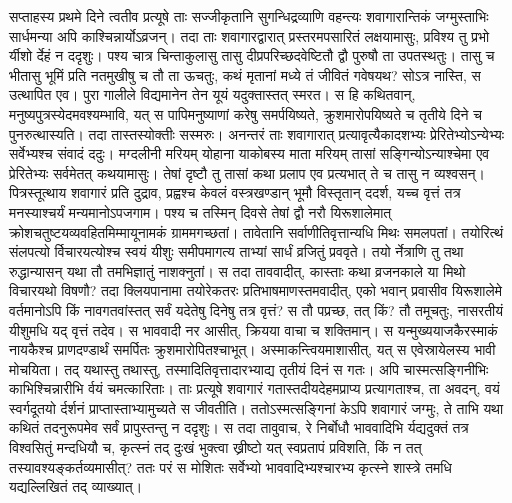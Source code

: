 \adhyAya
{}
\vakya सप्ताहस्य प्रथमे दिने त्वतीव प्रत्यूषे ताः सज्जीकृतानि सुगन्धिद्रव्याणि वहन्त्यः शवागारान्तिकं जग्मुस्ताभिः सार्धमन्या अपि काश्चिन्नार्योऽव्रजन्।
\vakya तदा ताः शवागारद्वारात् प्रस्तरमपसारितं लक्षयामासुः,
\vakya प्रविश्य तु प्रभो र्यीशो र्देहं न ददृशुः।
\vakya पश्य चात्र चिन्ताकुलासु तासु दीप्रपरिच्छदवेष्टितौ द्वौ पुरुषौ ता उपतस्थतुः।
\vakya तासु च भीतासु भूमिं प्रति नतमुखीषु च तौ ता ऊचतुः, कथं मृतानां मध्ये तं जीवितं गवेषयथ?
\vakya सोऽत्र नास्ति, स उत्थापित एव।
\vakya पुरा गालीले विद्यमानेन तेन यूयं यदुक्तास्तत् स्मरत।
\vakya स हि कथितवान्, मनुष्यपुत्रस्येदमवश्यम्भावि, यत् स पापिमनुष्याणां करेषु समर्पयिष्यते, क्रुशमारोपयिष्यते च तृतीये दिने च पुनरुत्थास्यति। तदा तास्तस्योक्तीः सस्मरुः।
\vakya अनन्तरं ताः शवागारात् प्रत्यावृत्यैकादशभ्यः प्रेरितेभ्योऽन्येभ्यः सर्वेभ्यश्च संवादं ददुः।
\vakya मग्दलीनी मरियम् योहाना याकोबस्य माता मरियम् तासां सङ्गिन्योऽन्याश्चेमा एव प्रेरितेभ्यः सर्वमेतत् कथयामासुः।
\vakya तेषां दृष्टौ तु तासां कथा प्रलाप एव प्रत्यभात् ते च तासु न व्यश्वसन्।
\vakya पित्रस्तूत्थाय शवागारं प्रति दुद्राव, प्रह्वश्च केवलं वस्त्रखण्डान् भूमौ विस्तृतान् ददर्श, यच्च वृत्तं तत्र मनस्याश्चर्यं मन्यमानोऽपजगाम।
\vakya पश्य च तस्मिन् दिवसे तेषां द्वौ नरौ यिरूशालेमात् क्रोशचतुष्टयव्यवहितमिम्मायूनामकं ग्राममगच्छतां।
\vakya तावेतानि सर्वाणीतिवृत्तान्यधि मिथः समलपतां।
\vakya तयोरित्थं संलपत्यो र्विचारयत्योश्च स्वयं यीशुः समीपमागत्य ताभ्यां सार्धं व्रजितुं प्रववृते।
\vakya तयो र्नेत्राणि तु तथा रुद्धान्यासन् यथा तौ तमभिज्ञातुं नाशक्नुतां।
\vakya स तदा ताववादीत्, कास्ताः कथा व्रजनकाले या मिथो विचारयथो विषणौ?
\vakya तदा क्लियपानामा तयोरेकतरः प्रतिभाषमाणस्तमवादीत्, एको भवान् प्रवासीव यिरूशालेमे वर्तमानोऽपि किं नावगतवांस्तत् सर्वं यदेतेषु दिनेषु तत्र वृत्तं?
\vakya स तौ पप्रच्छ, तत् किं? तौ तमूचतुः, नासरतीयं यीशुमधि यद् वृत्तं तदेव। स भाववादी नर आसीत्, क्रियया वाचा च शक्तिमान्।
\vakya स यन्मुख्ययाजकैरस्माकं नायकैश्च प्राणदण्डार्थं समर्पितः क्रुशमारोपितश्चाभूत्।
\vakya अस्माकन्त्वियमाशासीत्, यत् स एवेस्रायेलस्य भावी मोचयिता। तद् यथास्तु तथास्तु, तस्मादितिवृत्तादारभ्याद्य तृतीयं दिनं स गतः।
\vakya अपि चास्मत्सङ्गिनीभिः काभिश्चिन्नारीभि र्वयं चमत्कारिताः।
\vakya ताः प्रत्यूषे शवागारं गतास्तदीयदेहमप्राप्य प्रत्यागताश्च, ता अवदन्, वयं स्वर्गदूतयो र्दर्शनं प्राप्तास्ताभ्यामुच्यते स जीवतीति।
\vakya ततोऽस्मत्सङ्गिनां केऽपि शवागारं जग्मुः, ते ताभि यथा कथितं तदनुरूपमेव सर्वं प्रापुस्तन्तु न ददृशुः।
\vakya स तदा तावुवाच, रे निर्बोधौ भाववादिभि र्यद्यदुक्तं तत्र विश्वसितुं मन्दधियौ च,
\vakya कृत्स्नं तद् दुःखं भुक्त्वा ख्रीष्टो यत् स्वप्रतापं प्रविशति, किं न तत् तस्यावश्यङ्कर्तव्यमासीत्?
\vakya ततः परं स मोशितः सर्वेभ्यो भाववादिभ्यश्चारभ्य कृत्स्ने शास्त्रे तमधि यद्यल्लिखितं तद् व्याख्यात्।
